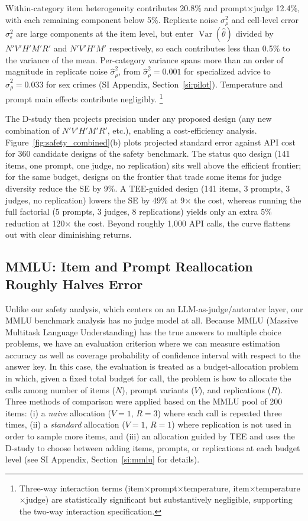 \documentclass{article}
\DeclareMathOperator{\Var}{Var}
\begin{document}
Within-category item heterogeneity contributes 20.8\% and prompt$\times$judge 12.4\%, with each remaining component below 5\%. Replicate noise $\sigma^2_\rho$ and cell-level error $\sigma^2_\epsilon$ are large components at the item level, but enter $\Var(\hat\theta)$ divided by $N'V'H'M'R'$ and $N'V'H'M'$ respectively, so each contributes less than 0.5\% to the variance of the mean. Per-category variance spans more than an order of magnitude in replicate noise $\hat{\sigma}^2_\rho$, from $\hat{\sigma}^2_\rho = 0.001$ for specialized advice to $\hat{\sigma}^2_\rho = 0.033$ for sex crimes (SI Appendix, Section~\ref{si:pilot}).
Temperature and prompt main effects contribute negligibly. \footnote{Three-way interaction terms (item$\times$prompt$\times$temperature, item$\times$temperature$\times$judge) are statistically significant but substantively negligible, supporting the two-way interaction specification.} 


The D-study then projects precision under any proposed design (any new combination of $N'V'H'M'R'$, etc.), enabling a cost-efficiency analysis. Figure~\ref{fig:safety_combined}(b) plots projected standard error against API cost for 360 candidate designs of the safety benchmark. The status quo design (141 items, one prompt, one judge, no replication) sits well above the efficient frontier; for the same budget, designs on the frontier that trade some items for judge diversity reduce the SE by 9\%. A TEE-guided design (141 items, 3 prompts, 3 judges, no replication) lowers the SE by 49\% at 9$\times$ the cost, whereas running the full factorial (5 prompts, 3 judges, 8 replications) yields only an extra 5\% reduction at 120$\times$ the cost. Beyond roughly 1,000 API calls, the curve flattens out with clear diminishing returns.



\subsection{MMLU: Item and Prompt Reallocation Roughly Halves Error}
\label{sec:mmlu}

Unlike our safety analysis, which centers on an LLM-as-judge/autorater layer, our MMLU benchmark analysis has no judge model at all. Because MMLU (Massive Multitask Language Understanding) \citep{hendrycks2021mmlu} has the true answers to multiple choice problems, we have an evaluation criterion where we can measure estimation accuracy as well as coverage probability of confidence interval with respect to the answer key. In this case, the evaluation is treated as a budget-allocation problem in which, given a fixed total budget for call, the problem is how to allocate the calls among number of items ($N$), prompt variants ($V$), and replications ($R$). Three methods of comparison were applied based on the MMLU pool of 200 items: (i) a \emph{naive} allocation ($V\!=\!1$, $R\!=\!3$) where each call is repeated three times, (ii) a \emph{standard} allocation ($V\!=\!1$, $R\!=\!1$) where replication is not used in order to sample more items, and (iii) an allocation guided by TEE and uses the D-study to choose between adding items, prompts, or replications at each budget level (see SI Appendix, Section~\ref{si:mmlu} for details).
\end{document}
